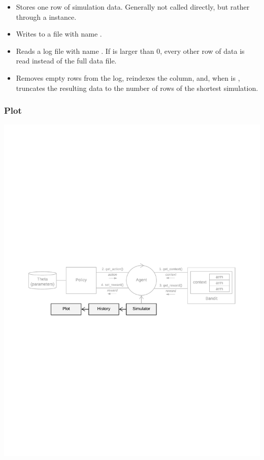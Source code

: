 \documentclass{jss}
\begin{document}
\begin{itemize}
 \item{}{
    Stores one row of simulation data. Generally not called directly,
    but rather through a  instance.
 }
 \item{}{
    Writes  to a file with name .
 }
 \item{}{
    Reads a  log file with name .
    If  is larger than 0, every other  row of data is read instead of the
    full data file.
 }
 \item{}{
    Removes empty rows from the  log, reindexes the  column, and,
    when  is , truncates the resulting data to the number of rows of the shortest
    simulation.
 }
\end{itemize}

\subsubsection{Plot}

\includegraphics[width=\textwidth]{fig/all_cmab_phases_Part8}
\end{document}

